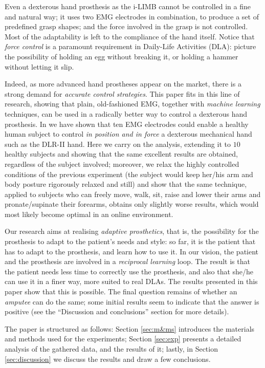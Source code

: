 \documentclass[10pt]{bmc_article}
\newenvironment{bmcformat}{\begin{raggedright}\baselineskip20pt\sloppy\setboolean{publ}{false}}{\end{raggedright}\baselineskip20pt\sloppy}
\begin{document}
\begin{bmcformat}
Even a dexterous hand prosthesis as the i-LIMB cannot be controlled in
a fine and natural way; it uses two EMG electrodes in combination, to
produce a set of predefined grasp shapes; and the force involved in
the grasp is not controlled. Most of the adaptability is left to the
compliance of the hand itself. Notice that \emph{force control} is a
paramount requirement in Daily-Life Activities (DLA): picture the
possibility of holding an egg without breaking it, or holding a hammer
without letting it slip.

Indeed, as more advanced hand prostheses appear on the market, there
is a strong demand for \emph{accurate control strategies}. This paper
fits in this line of research, showing that plain, old-fashioned EMG,
together with \emph{machine learning} techniques, can be used in a
radically better way to control a dexterous hand prosthesis. In
\cite{2008.ICRA,2008.BioCyb} we have shown that ten EMG electrodes
could enable a healthy human subject to control \emph{in position and
in force} a dexterous mechanical hand such as the DLR-II hand. Here we
carry on the analysis, extending it to $10$ healthy subjects and
showing that the same excellent results are obtained, regardless of
the subject involved; moreover, we relax the highly controlled
conditions of the previous experiment (the subject would keep her/his
arm and body posture rigorously relaxed and still) and show that the
same technique, applied to subjects who can freely move, walk, sit,
raise and lower their arms and pronate/supinate their forearms,
obtains only slightly worse results, which would most likely become
optimal in an online environment.

Our research aims at realising \emph{adaptive prosthetics}, that is,
the possibility for the prosthesis to adapt to the patient's needs and
style: so far, it is the patient that has to adapt to the prosthesis,
and learn how to use it. In our vision, the patient and the prosthesis
are involved in a \emph{reciprocal learning} loop. The result is that
the patient needs less time to correctly use the prosthesis, and also
that she/he can use it in a finer way, more suited to real DLAs. The
results presented in this paper show that this is possible. The final
question remains of whether an
\emph{amputee} can do the same; some initial results seem to indicate
that the answer is positive (see the ``Discussion and conclusions''
section for more details).

The paper is structured as follows: Section \ref{sec:m&ms} introduces
the materials and methods used for the experiments; Section
\ref{sec:exp} presents a detailed analysis of the gathered data, and
the results of it; lastly, in Section \ref{sec:discussion} we discuss
the results and draw a few conclusions.


\end{bmcformat}
\end{document}
